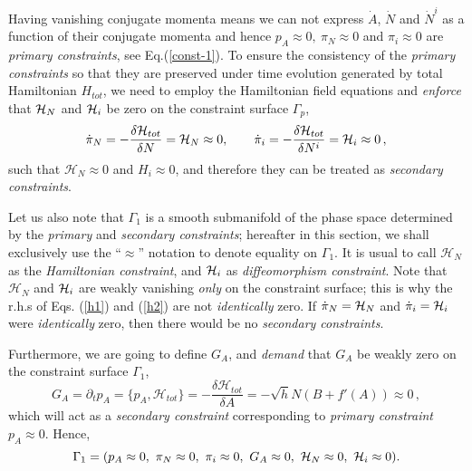\documentclass[a4paper,12pt]{article}
\newcommand{\Ga}{\Gamma}
\newcommand{\cH}{{\cal H}}
\newcommand{\+}{^{\dagger}}
\newcommand{\2}{\frac{1}{2}}
\newcommand{\3}{\frac{1}{3}}
\newcommand{\4}{\frac{1}{4}}
\newcommand{\6}{\frac{1}{6}}
\newcommand{\8}{\frac{1}{8}}
\begin{document}
Having vanishing conjugate momenta means we can not express $\dot{A}$, $\dot{N}$ and $\dot{N}^i$ as a function 
of their conjugate momenta and hence $p_A\approx0,~\pi_N\approx0$ and $\pi_i\approx0$ are \textit{primary constraints},
see Eq.(\ref{const-1}). To ensure the consistency of the {\it primary constraints} so that they are preserved under time evolution 
generated by total Hamiltonian $H_{tot}$, we need to employ the Hamiltonian
field equations and \textit{enforce} that $\cH_{N}$ and $\cH_{i}$ be zero on the constraint surface $\Ga_p$,
\begin{equation}\label{secondaryconstraints1}
\dot{\pi}_{N}=-\frac{\delta \mathcal{H}_{tot}}{\delta N}=\cH_{N}\approx0,\qquad \dot{\pi}_{i}=-\frac{\delta \mathcal{H}_{tot}}{\delta N^i}=\cH_{i}\approx0\,,
\end{equation}
%
such that $\mathcal{H}_{N}\approx0$ and $H_{i}\approx0$, and therefore they can be treated as \textit{secondary constraints}. 

Let us also note that $\Ga_1$ is a smooth submanifold of the phase space determined by the {\it primary} and  {\it secondary constraints}; hereafter in this section, we shall exclusively use the ``$\approx$'' notation to denote equality on $\Ga_1$. 
It is usual to call $\mathcal{H}_{N}$ as the \textit{Hamiltonian constraint}, and $\cH_i$ as  \textit{diffeomorphism constraint}. Note that  $\mathcal{H}_{N}$ and $\cH_{i}$ are weakly vanishing \textit{only} on the constraint surface; this is why the r.h.s of Eqs. (\ref{h1}) and (\ref{h2}) are not  {\it identically} zero. If $\dot{\pi}_{N}=\cH_{N}$ and $\dot{\pi}_{i}=\cH_{i}$ were \textit{identically} zero, then there would be no {\it secondary constraints}.  

Furthermore, we are going to define $G_A$, and \textit{demand} that $G_A$ be weakly zero on the constraint surface 
$\Ga_1$,
\begin{equation}
G_{A}=\partial_tp_A=\{{p_A},\mathcal{H}_{tot}\}=-\frac{\delta \mathcal{H}_{tot} }{\delta A}=-\sqrt{h}N(B+f'(A))\approx0\,,
\end{equation}
which will act as a {\it secondary constraint} corresponding to {\it primary constraint} $p_A\approx0$.  Hence, 
$$\Ga_1=(p_A \approx 0,~\pi_N \approx 0,~\pi_i \approx 0,~G_A \approx 0,~{\cal H}_{N}\approx 0,~{\cal H}_{i}\approx 0).$$
\end{document}
